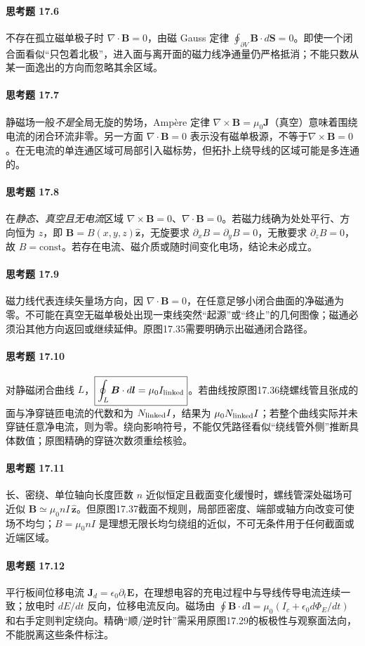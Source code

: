 \paragraph{思考题 17.6}
不存在孤立磁单极子时 \(\nabla\cdot\boldsymbol B=0\)，由磁 Gauss 定律 \(\boxed{\oint_{\partial V}\boldsymbol B\cdot d\boldsymbol S=0}\)。即使一个闭合面看似“只包着北极”，进入面与离开面的磁力线净通量仍严格抵消；不能只数从某一面逸出的方向而忽略其余区域。

\paragraph{思考题 17.7}
静磁场一般\emph{不是}全局无旋的势场，Ampère 定律 \(\nabla\times\boldsymbol B=\mu_0\boldsymbol J\)（真空）意味着围绕电流的闭合环流非零。另一方面 \(\nabla\cdot\boldsymbol B=0\) 表示没有磁单极源，不等于\(\nabla\times\boldsymbol B=0\)。在无电流的单连通区域可局部引入磁标势，但拓扑上绕导线的区域可能是多连通的。

\paragraph{思考题 17.8}
在\emph{静态、真空且无电流}区域 \(\nabla\times\boldsymbol B=0\)、\(\nabla\cdot\boldsymbol B=0\)。若磁力线确为处处平行、方向恒为 \(z\)，即 \(\boldsymbol B=B(x,y,z)\hat{\boldsymbol z}\)，无旋要求 \(\partial_xB=\partial_yB=0\)，无散要求 \(\partial_zB=0\)，故 \(\boxed{B=\mathrm{const}}\)。若存在电流、磁介质或随时间变化电场，结论未必成立。

\paragraph{思考题 17.9}
磁力线代表连续矢量场方向，因 \(\nabla\cdot\boldsymbol B=0\)，在任意足够小闭合曲面的净磁通为零。不可能在真空无磁单极处出现一束线突然“起源”或“终止”的几何图像；磁通必须沿其他方向返回或继续延伸。原图17.35需要明确示出磁通闭合路径。

\paragraph{思考题 17.10}
对静磁闭合曲线 \(L\)，\(\boxed{\oint_L\boldsymbol B\cdot d\boldsymbol l=\mu_0 I_{\rm linked}}\)。若曲线按原图17.36绕螺线管且张成的面与净穿链匝电流的代数和为 \(N_{\rm linked}I\)，结果为 \(\mu_0N_{\rm linked}I\)；若整个曲线实际并未穿链任意净电流，则为零。绕向影响符号，不能仅凭路径看似“绕线管外侧”推断具体数值；原图精确的穿链次数须重绘核验。

\paragraph{思考题 17.11}
长、密绕、单位轴向长度匝数 \(n\) 近似恒定且截面变化缓慢时，螺线管深处磁场可近似 \(\boldsymbol B\simeq\mu_0nI\,\hat{\boldsymbol z}\)。但原图17.37截面不规则，局部匝密度、端部或轴方向改变可使场不均匀；\(\boxed{B=\mu_0nI}\) 是理想无限长均匀绕组的近似，不可无条件用于任何截面或近端区域。

\paragraph{思考题 17.12}
平行板间位移电流 \(\boldsymbol J_d=\epsilon_0\partial_t\boldsymbol E\)，在理想电容的充电过程中与导线传导电流连续一致；放电时 \(dE/dt\) 反向，位移电流反向。磁场由 \(\oint\boldsymbol B\cdot d\boldsymbol l=\mu_0(I_c+\epsilon_0d\Phi_E/dt)\) 和右手定则判定绕向。精确“顺/逆时针”需采用原图17.29的板极性与观察面法向，不能脱离这些条件标注。
